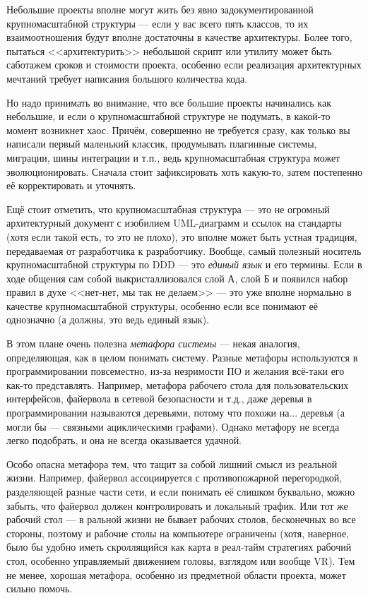 \documentclass{../../text-style}
\begin{document}
Небольшие проекты вполне могут жить без явно задокументированной крупномасштабной структуры --- если у вас всего пять классов, то их взаимоотношения будут вполне достаточны в качестве архитектуры. Более того, пытаться <<архитектурить>> небольшой скрипт или утилиту может быть саботажем сроков и стоимости проекта, особенно если реализация архитектурных мечтаний требует написания большого количества кода. 

Но надо принимать во внимание, что все большие проекты начинались как небольшие, и если о крупномасштабной структуре не подумать, в какой-то момент возникнет хаос. Причём, совершенно не требуется сразу, как только вы написали первый маленький классик, продумывать плагинные системы, миграции, шины интеграции и т.п., ведь крупномасштабная структура может эволюционировать. Сначала стоит зафиксировать хоть какую-то, затем постепенно её корректировать и уточнять.

Ещё стоит отметить, что крупномасштабная структура --- это не огромный архитектурный документ с изобилием UML-диаграмм и ссылок на стандарты (хотя если такой есть, то это не плохо), это вполне может быть устная традиция, передаваемая от разработчика к разработчику. Вообще, самый полезный носитель крупномасштабной структуры по DDD --- это \textit{единый язык} и его термины. Если в ходе общения сам собой выкристаллизовался слой А, слой Б и появился набор правил в духе <<нет-нет, мы так не делаем>> --- это уже вполне нормально в качестве крупномасштабной структуры, особенно если все понимают её однозначно (а должны, это ведь единый язык).

В этом плане очень полезна \textit{метафора системы} --- некая аналогия, определяющая, как в целом понимать систему. Разные метафоры используются в программировании повсеместно, из-за незримости ПО и желания всё-таки его как-то представлять. Например, метафора рабочего стола для пользовательских интерфейсов, файервола в сетевой безопасности и т.д., даже деревья в программировании называются деревьями, потому что похожи на... деревья (а могли бы --- связными ациклическими графами). Однако метафору не всегда легко подобрать, и она не всегда оказывается удачной. 

Особо опасна метафора тем, что тащит за собой лишний смысл из реальной жизни. Например, файервол ассоциируется с противопожарной перегородкой, разделяющей разные части сети, и если понимать её слишком буквально, можно забыть, что файервол должен контролировать и локальный трафик. Или тот же рабочий стол --- в ральной жизни не бывает рабочих столов, бесконечных во все стороны, поэтому и рабочие столы на компьютере ограничены (хотя, наверное, было бы удобно иметь скроллящийся как карта в реал-тайм стратегиях рабочий стол, особенно управляемый движением головы, взглядом или вообще VR). Тем не менее, хорошая метафора, особенно из предметной области проекта, может сильно помочь.
\end{document}
